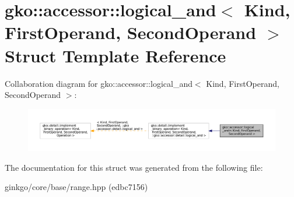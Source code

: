 \hypertarget{structgko_1_1accessor_1_1logical__and}{}\section{gko\+:\+:accessor\+:\+:logical\+\_\+and$<$ Kind, First\+Operand, Second\+Operand $>$ Struct Template Reference}
\label{structgko_1_1accessor_1_1logical__and}


Collaboration diagram for gko\+:\+:accessor\+:\+:logical\+\_\+and$<$ Kind, First\+Operand, Second\+Operand $>$\+:
\nopagebreak
\begin{figure}[H]
\begin{center}
\leavevmode
\includegraphics[width=350pt]{structgko_1_1accessor_1_1logical__and__coll__graph}
\end{center}
\end{figure}


The documentation for this struct was generated from the following file\+:\begin{DoxyCompactItemize}
\item 
ginkgo/core/base/range.\+hpp (edbc7156)\end{DoxyCompactItemize}
